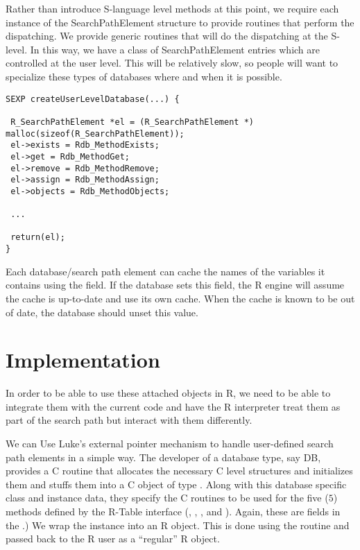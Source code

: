 \documentclass{article}
\begin{document}
Rather than introduce S-language level methods at this point, we
require each instance of the SearchPathElement structure to provide
routines that perform the dispatching.  We provide generic routines
that will do the dispatching at the S-level. In this way, we have a
class of SearchPathElement entries which are controlled at the user
level. This will be relatively slow, so people will want to specialize
these types of databases where and when it is possible.

\begin{verbatim}
SEXP createUserLevelDatabase(...) {

 R_SearchPathElement *el = (R_SearchPathElement *) malloc(sizeof(R_SearchPathElement));
 el->exists = Rdb_MethodExists;
 el->get = Rdb_MethodGet;
 el->remove = Rdb_MethodRemove;
 el->assign = Rdb_MethodAssign;
 el->objects = Rdb_MethodObjects;

 ...

 return(el);
}
\end{verbatim}


Each database/search path element can cache the names of the variables
it contains using the  field.  If the database
sets this field, the R engine will assume the cache is up-to-date and
use its own cache. When the cache is known to be out of date, the
database should unset this value.


\section{Implementation}
In order to be able to use these attached objects in R,
we need to be able to integrate them with the current code
and have the R interpreter treat them as part of the
search path but interact with them differently.

We can Use Luke's external pointer mechanism to handle user-defined
search path elements in a simple way.  The developer of a database
type, say DB, provides a C routine that allocates the necessary C
level structures and initializes them and stuffs them into a C object
of type . Along with this database specific
class and instance data, they specify the C routines to be used for
the five ($5$) methods defined by the R-Table interface
(, , ,
 and ). Again, these are fields in
the .)  We wrap the 
instance into an R object. This is done using the
 routine and passed back to the R user as
a ``regular'' R object.
\end{document}
